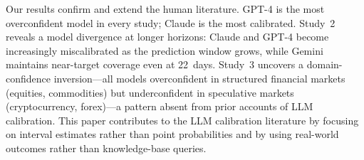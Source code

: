 Our results confirm and extend the human literature. GPT-4 is the most
overconfident model in every study; Claude is the most calibrated. Study~2
reveals a model divergence at longer horizons: Claude and GPT-4 become
increasingly miscalibrated as the prediction window grows, while Gemini
maintains near-target coverage even at 22~days. Study~3 uncovers a
domain-confidence inversion---all models overconfident in structured financial
markets (equities, commodities) but underconfident in speculative markets
(cryptocurrency, forex)---a pattern absent from prior accounts of LLM
calibration. This paper contributes to the LLM calibration literature
\citep{Kadavath2022, Xiong2024} by focusing on interval estimates rather
than point probabilities and by using real-world outcomes rather than
knowledge-base queries.
